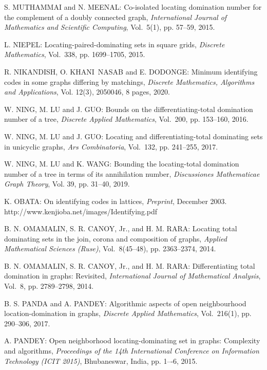 \begin{thebibliography}{999}
S. MUTHAMMAI and N. MEENAL: Co-isolated locating domination number for the complement of a doubly connected graph, {\it International Journal of Mathematics and Scientific Computing}, Vol.~5(1), pp. 57--59, 2015.

L. NIEPEL: Locating-paired-dominating sets in square grids, {\it Discrete Mathematics}, Vol.~338, pp. 1699--1705, 2015.

R. NIKANDISH, O. KHANI~NASAB and E. DODONGE: Minimum identifying codes in some graphs differing by matchings, {\it Discrete Mathematics, Algorithms and Applications}, Vol. 12(3), 2050046, 8 pages, 2020.

W. NING, M. LU and J. GUO: Bounds on the differentiating-total domination number of a tree, {\it Discrete Applied Mathematics}, Vol.~200, pp. 153--160, 2016.

W. NING, M. LU and J. GUO: Locating and differentiating-total dominating sets in unicyclic graphs, {\it Ars Combinatoria}, Vol.~132, pp. 241--255, 2017.

W. NING, M. LU and K. WANG: Bounding the locating-total domination number of a tree in terms of its annihilation number, {\it Discussiones Mathematicae Graph Theory}, Vol. 39, pp. 31--40, 2019.

K. OBATA: On identifying codes in lattices, {\it Preprint}, December 2003.\\
http://www.kenjioba.net/images/Identifying.pdf

B. N. OMAMALIN, S. R. CANOY, Jr., and H. M. RARA: Locating total dominating sets in the join, corona and composition of graphs, {\it Applied Mathematical Sciences (Ruse)}, Vol.~8(45--48), pp. 2363--2374, 2014.

B. N. OMAMALIN, S. R. CANOY, Jr., and H. M. RARA: Differentiating total domination in graphs: Revisited, {\it International Journal of Mathematical Analysis}, Vol.~8, pp. 2789--2798, 2014.

B. S. PANDA and A. PANDEY: Algorithmic aspects of open neighbourhood location-domination in graphs, {\it Discrete Applied Mathematics}, Vol.~216(1), pp. 290--306, 2017.

A. PANDEY: Open neighborhood locating-dominating set in graphs: Complexity and algorithms, {\it Proceedings of the 14th International Conference on Information Technology (ICIT 2015)}, Bhubaneswar, India, pp. 1–-6, 2015.


\end{thebibliography}
